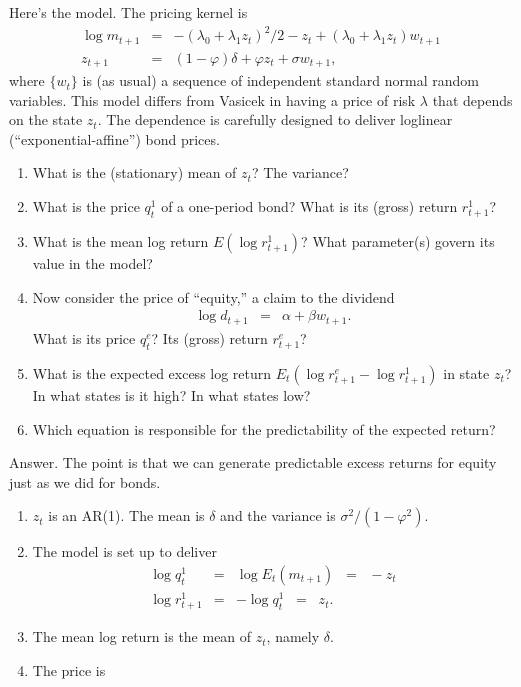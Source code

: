 \documentclass[11pt]{article}
\begin{document}
\begin{enumerate}
Here's the model.  The pricing kernel is
\begin{eqnarray*}
    \log m_{t+1} &=& - (\lambda_0 + \lambda_1 z_t)^2/2 - z_t
                + (\lambda_0 + \lambda_1 z_t) w_{t+1} \\
        z_{t+1} &=& (1-\varphi) \delta + \varphi z_t + \sigma w_{t+1} ,
\end{eqnarray*}
where $\{ w_t \}$ is (as usual) a sequence of independent standard normal random variables.
This model differs from Vasicek in having a price of risk $\lambda$ that
depends on the state $z_t$.
The dependence is carefully designed to deliver loglinear (``exponential-affine'')
bond prices.
%
\begin{enumerate}
\item  What is the (stationary) mean of $z_t$?  The variance?
\item  What is the price $q^1_t$ of a one-period bond?
What is its (gross) return $r^1_{t+1}$?
\item  What is the mean log return $E (\log r^1_{t+1})$?
What parameter(s) govern its value in the model?
\item  Now consider the price of ``equity,'' a claim to the dividend
\begin{eqnarray*}
    \log d_{t+1} &=&  \alpha + \beta w_{t+1} .
\end{eqnarray*}
What is its price $q^e_t$?
Its (gross) return $r^e_{t+1}$?
\item  What is the expected excess log return $ E_t (\log r^e_{t+1} - \log r^1_{t+1})$ in state $z_t$?
In what states is it high?  In what states low?
\item  Which equation is responsible for the predictability of the expected return?
\end{enumerate}
%
Answer.
The point is that we can generate predictable excess
returns for equity just as we did for bonds.
\begin{enumerate}
\item  $z_t$ is an AR(1).
The mean is $\delta$ and the variance is $\sigma^2/(1-\varphi^2)$.
\item   The model is set up to deliver
\begin{eqnarray*}
    \log q^1_t &=& \log E_t (m_{t+1}) \;\;=\;\; - z_t \\
    \log r^1_{t+1} &=& - \log q^1_t \;\;=\;\; z_t .
\end{eqnarray*}
\item  The mean log return is the mean of $z_t$, namely $\delta$.
\item  The price is

\end{enumerate}
\end{enumerate}
\end{document}
